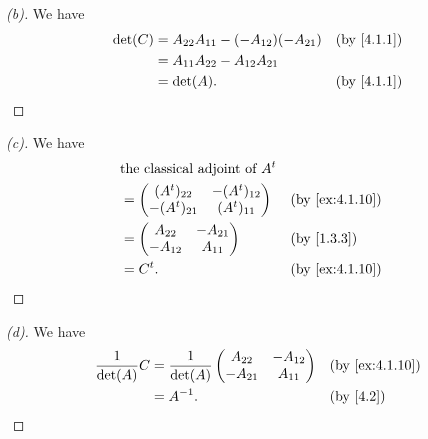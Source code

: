 \begin{proof}[(b)]
  We have
  \begin{align*}
    \det(C) & = A_{2 2} A_{1 1} - (-A_{1 2}) (-A_{2 1}) &  & \text{(by \cref{4.1.1})} \\
            & = A_{1 1} A_{2 2} - A_{1 2} A_{2 1}                                     \\
            & = \det(A).                                &  & \text{(by \cref{4.1.1})}
  \end{align*}
\end{proof}

\begin{proof}[(c)]
  We have
  \begin{align*}
     & \text{the classical adjoint of } \tp{A}                                   \\
     & = \begin{pmatrix}
           (\tp{A})_{2 2}  & -(\tp{A})_{1 2} \\
           -(\tp{A})_{2 1} & (\tp{A})_{1 1}
         \end{pmatrix}    &  & \text{(by \cref{ex:4.1.10})}                      \\
     & = \begin{pmatrix}
           A_{2 2}  & -A_{2 1} \\
           -A_{1 2} & A_{1 1}
         \end{pmatrix}                  &  & \text{(by \cref{1.3.3})}            \\
     & = \tp{C}.                               &  & \text{(by \cref{ex:4.1.10})}
  \end{align*}
\end{proof}

\begin{proof}[(d)]
  We have
  \begin{align*}
    \frac{1}{\det(A)} C & = \frac{1}{\det(A)} \begin{pmatrix}
                                                A_{2 2}  & -A_{1 2} \\
                                                -A_{2 1} & A_{1 1}
                                              \end{pmatrix} &  & \text{(by \cref{ex:4.1.10})} \\
                        & = A^{-1}.                           &  & \text{(by \cref{4.2})}
  \end{align*}
\end{proof}

